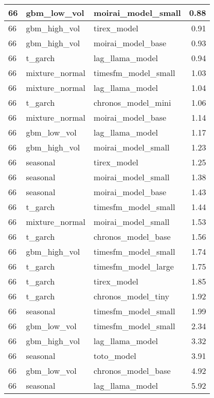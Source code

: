 {\begin{tabular}{lllr}
\midrule
66 & gbm\_low\_vol & moirai\_model\_small & 0.88 \\
\midrule
66 & gbm\_high\_vol & tirex\_model & 0.91 \\
\midrule
66 & gbm\_high\_vol & moirai\_model\_base & 0.93 \\
\midrule
66 & t\_garch & lag\_llama\_model & 0.94 \\
\midrule
66 & mixture\_normal & timesfm\_model\_small & 1.03 \\
\midrule
66 & mixture\_normal & lag\_llama\_model & 1.04 \\
\midrule
66 & t\_garch & chronos\_model\_mini & 1.06 \\
\midrule
66 & mixture\_normal & moirai\_model\_base & 1.14 \\
\midrule
66 & gbm\_low\_vol & lag\_llama\_model & 1.17 \\
\midrule
66 & gbm\_high\_vol & moirai\_model\_small & 1.23 \\
\midrule
66 & seasonal & tirex\_model & 1.25 \\
\midrule
66 & seasonal & moirai\_model\_small & 1.38 \\
\midrule
66 & seasonal & moirai\_model\_base & 1.43 \\
\midrule
66 & t\_garch & timesfm\_model\_small & 1.44 \\
\midrule
66 & mixture\_normal & moirai\_model\_small & 1.53 \\
\midrule
66 & t\_garch & chronos\_model\_base & 1.56 \\
\midrule
66 & gbm\_high\_vol & timesfm\_model\_small & 1.74 \\
\midrule
66 & t\_garch & timesfm\_model\_large & 1.75 \\
\midrule
66 & t\_garch & tirex\_model & 1.85 \\
\midrule
66 & t\_garch & chronos\_model\_tiny & 1.92 \\
\midrule
66 & seasonal & timesfm\_model\_small & 1.99 \\
\midrule
66 & gbm\_low\_vol & timesfm\_model\_small & 2.34 \\
\midrule
66 & gbm\_high\_vol & lag\_llama\_model & 3.32 \\
\midrule
66 & seasonal & toto\_model & 3.91 \\
\midrule
66 & gbm\_low\_vol & chronos\_model\_base & 4.92 \\
\midrule
66 & seasonal & lag\_llama\_model & 5.92 \\
\bottomrule
\end{tabular}
}